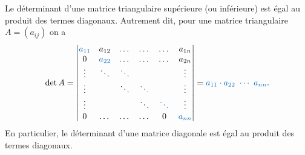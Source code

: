 \documentclass{book}
\begin{document}
\begin{Proposition}
Le déterminant d'une matrice triangulaire supérieure (ou inférieure)
est égal au produit des termes diagonaux. Autrement dit, pour une matrice triangulaire $A = (a_{ij})$  on a
$$\det A = \begin{vmatrix}
{\color{colorprop}a_{11}} & a_{12} &\dots&\dots&\dots & a_{1n}\\
0&{\color{colorprop}a_{22}}&\dots&\dots&\dots&a_{2n}\\
\vdots&\ddots&{\color{colorprop}\ddots}&&&\vdots\\
\vdots&&\ddots&{\color{colorprop}\ddots}&&\vdots\\
\vdots & &&\ddots&{\color{colorprop}\ddots}&\vdots\\
0&\dots&\dots&\dots&0&{\color{colorprop}a_{nn}}
  \end{vmatrix} = {\color{colorprop}a_{11}\cdot a_{22} \ \cdots\  a_{nn}}.
$$
En particulier, le déterminant d'une matrice diagonale est égal au produit des termes diagonaux.
\end{Proposition}
\end{document}
